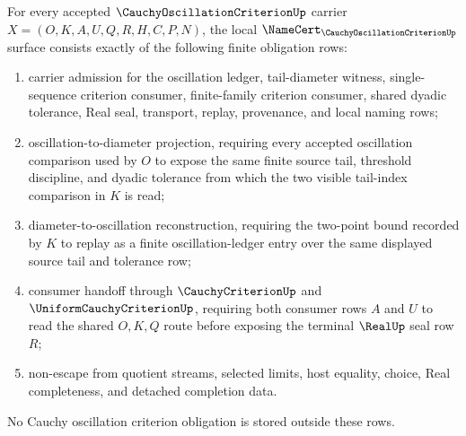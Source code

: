 \begin{theorem}
\label{thm:cauchy-oscillation-criterion-namecert-obligations}
For every accepted $\CauchyOscillationCriterionUp$ carrier $X=(O,K,A,U,Q,R,H,C,P,N)$, the local $\NameCert_{\CauchyOscillationCriterionUp}$ surface consists exactly of the following finite obligation rows:
\begin{enumerate}
\item carrier admission for the oscillation ledger, tail-diameter witness, single-sequence criterion consumer, finite-family criterion consumer, shared dyadic tolerance, Real seal, transport, replay, provenance, and local naming rows;
\item oscillation-to-diameter projection, requiring every accepted oscillation comparison used by $O$ to expose the same finite source tail, threshold discipline, and dyadic tolerance from which the two visible tail-index comparison in $K$ is read;
\item diameter-to-oscillation reconstruction, requiring the two-point bound recorded by $K$ to replay as a finite oscillation-ledger entry over the same displayed source tail and tolerance row;
\item consumer handoff through $\CauchyCriterionUp$ and $\UniformCauchyCriterionUp$, requiring both consumer rows $A$ and $U$ to read the shared $O,K,Q$ route before exposing the terminal $\RealUp$ seal row $R$;
\item non-escape from quotient streams, selected limits, host equality, choice, Real completeness, and detached completion data.
\end{enumerate}
No Cauchy oscillation criterion obligation is stored outside these rows.
\end{theorem}

